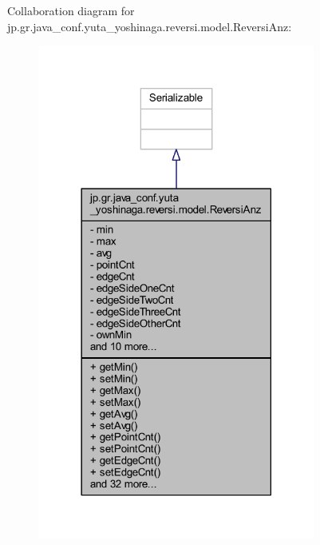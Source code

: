 Collaboration diagram for jp.\+gr.\+java\+\_\+conf.\+yuta\+\_\+yoshinaga.\+reversi.\+model.\+Reversi\+Anz\+:\nopagebreak
\begin{figure}[H]
\begin{center}
\leavevmode
\includegraphics[width=258pt]{classjp_1_1gr_1_1java__conf_1_1yuta__yoshinaga_1_1reversi_1_1model_1_1_reversi_anz__coll__graph}
\end{center}
\end{figure}
